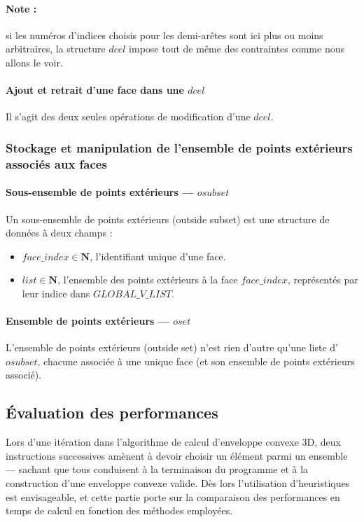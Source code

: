 \documentclass[]{article}
\begin{document}
\paragraph*{Note :} si les numéros d'indices choisis pour les demi-arêtes sont ici plus ou moins arbitraires, la structure $dcel$ impose tout de même des contraintes comme nous allons le voir.

\paragraph{Ajout et retrait d'une face dans une $dcel$}
Il s'agit des deux seules opérations de modification d'une $dcel$.

\subsubsection{Stockage et manipulation de l'ensemble de points extérieurs associés aux faces}
\paragraph*{Sous-ensemble de points extérieurs — $osubset$}
Un sous-ensemble de points extérieurs (outside subset) est une structure de données à deux champs :
\begin{itemize}
	\item $face\_index \in \mathbf{N}$, l'identifiant unique d'une face.
	\item $list \in \mathbf{N}$, l'ensemble des points extérieurs à la face $face\_index$, représentés par leur indice dans $GLOBAL\_V\_LIST$.
\end{itemize}

\paragraph*{Ensemble de points extérieurs — $oset$}
L'ensemble de points extérieurs (outside set) n'est rien d'autre qu'une liste d'$osubset$, chacune associée à une unique face (et son ensemble de points extérieurs associé).

\subsection{Évaluation des performances}
Lors d'une itération dans l'algorithme de calcul d'enveloppe convexe 3D, deux instructions successives amènent à devoir choisir un élément parmi un ensemble — sachant que tous conduisent à la terminaison du programme et à la construction d'une enveloppe convexe valide. Dès lors l'utilisation d'heuristiques est envisageable, et cette partie porte sur la comparaison des performances en temps de calcul en fonction des méthodes employées.
\end{document}
